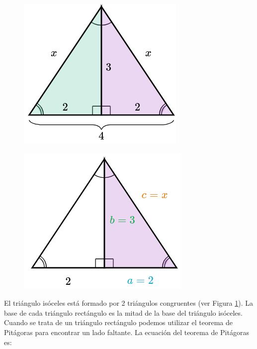 \begin{solutionbox}{11cm}
    \begin{minipage}{0.3\textwidth}
        \begin{figure}[H]
            \centering
            \includegraphics[width=0.6\linewidth]{../images/pitagoras14a.png}
            \caption{}
            \label{fig:pitagoras14a}
        \end{figure}
        \begin{figure}[H]
            \centering
            \includegraphics[width=0.6\linewidth]{../images/pitagoras14b.png}
            \caption{}
            \label{fig:pitagoras14b}
        \end{figure}
    \end{minipage}\hfill
    \begin{minipage}{0.65\textwidth}
        El triángulo isóceles está formado por 2 triángulos congruentes (ver Figura \ref{fig:pitagoras14a}).
        La base de cada triángulo rectángulo es la mitad de la base del triángulo isóceles.
        Cuando se trata de un triángulo rectángulo podemos utilizar el teorema de Pitágoras para encontrar un lado faltante.
        La ecuación del teorema de Pitágoras es:

\end{minipage}
\end{solutionbox}
